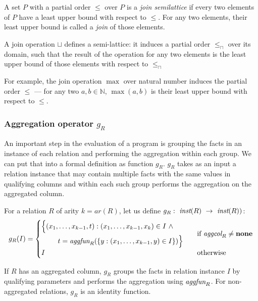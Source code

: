 \begin{defn}
A set $P$ with a partial order $\le$ over $P$ is a \emph{join semilattice} if every two elements of $P$ have a least upper bound with respect to $\le$. For any two elements, their least upper bound is called a \emph{join} of those elements.
\end{defn}

A join operation $\sqcup$ defines a semi-lattice: it induces a partial order $\le_\sqcap$ over its domain, such that the result of the operation for any two elements is the least upper bound of those elements with respect to $\le_\sqcap$

For example, the join operation $\max$ over natural number induces the partial order $\le$ --- for any two $a, b \in \mathbb{N}$, $\max(a, b)$ is their least upper bound with respect to $\le$.

\subsubsection{Aggregation operator $g_R$}
An important step in the evaluation of a \datalogra program is grouping the facts in an instance of each relation and performing the aggregation within each group. We can put that into a formal definition as function $g_R$. $g_R$ takes as an input a relation instance that may contain multiple facts with the same values in  qualifying columns and within each such group performs the aggregation on the aggregated column.
\begin{defn}\label{d:aggregationoperationgr}
For a relation $R$ of arity $k = ar(R)$, let us define $g_R:~\textit{inst}(R)~\to~\textit{inst}(R))$:
$$
g_R(I) = \begin{cases}
\!\begin{aligned}%
       \Big\{(x_1, &\dots, x_{k-1}, t): (x_1, \dots, x_{k-1}, x_k) \in I~\wedge & \\
           &t = \aggfun_R(\{y: (x_1, \dots, x_{k-1}, y) \in I\})\Big\}&
    \end{aligned}          & \text{if } \aggcol_R \ne \bf{none} \\
I                          & \text{otherwise}
\end{cases}
$$
\end{defn}

If $R$ has an aggregated column, $g_R$ groups the facts in relation instance $I$ by qualifying parameters and performs the aggregation using $\textit{aggfun}_R$. For non-aggregated relations, $g_R$ is an identity function.


